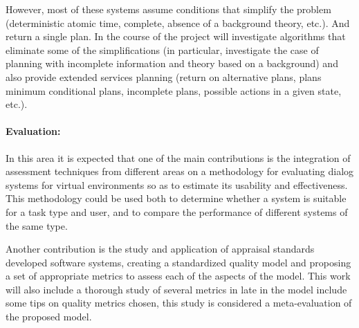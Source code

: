 However, most of these systems assume conditions that simplify the problem
(deterministic atomic time, complete, absence of a background theory, etc.). And
return a single plan. In the course of the project will investigate algorithms
that eliminate some of the simplifications (in particular, investigate the case
of planning with incomplete information and theory based on a background) and
also provide extended services planning (return on alternative plans, plans
minimum conditional plans, incomplete plans, possible actions in a given state,
etc.).


\paragraph{Evaluation:}
In this area it is expected that one of the main contributions is the
integration of assessment techniques from different areas on a methodology for
evaluating dialog systems for virtual environments so as to estimate its
usability and effectiveness. This methodology could be used both to determine
whether a system is suitable for a task type and user, and to compare the
performance of different systems of the same type.


Another contribution is the study and application of appraisal standards
developed software systems, creating a standardized quality model and proposing
a set of appropriate metrics to assess each of the aspects of the model. This
work will also include a thorough study of several metrics in late in the model
include some tips on quality metrics chosen, this study is considered a
meta-evaluation of the proposed model.

